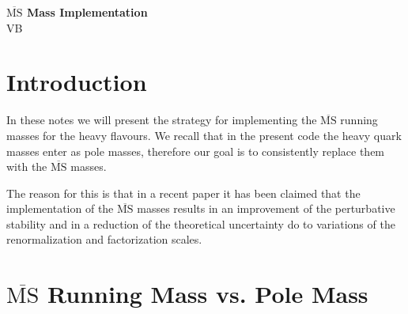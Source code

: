 \documentclass[10pt,a4paper]{article}
\begin{document}
\begin{center}
\textbf{\Large $\overline{\mbox{MS}}$ Mass Implementation}\\
{\large VB}
\end{center}

\tableofcontents

\newpage

\section{Introduction}

In these notes we will present the strategy for implementing the $\overline{\mbox{MS}}$ running masses for the heavy flavours. We recall that in the present code the heavy quark masses enter as pole masses, therefore our goal is to consistently replace them with the $\overline{\mbox{MS}}$ masses.

The reason for this is that in a recent paper \cite{Alekhin:2010sv} it has been claimed that the implementation of the $\overline{\mbox{MS}}$ masses results in an improvement of the perturbative stability and in a reduction of the theoretical uncertainty do to variations of the renormalization and factorization scales.

\section{$\overline{\mbox{MS}}$ Running Mass vs. Pole Mass}
\end{document}
